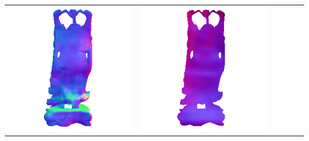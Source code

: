 \begin{tabularx}{\linewidth}{@{}Y@{}Y@{}Y@{}Y@{}Y@{}Y@{}}
\includegraphics[width=\linewidth]{semisynthetic/20160617_20_marrnet_out.png} &
\includegraphics[width=\linewidth]{semisynthetic/20160617_20_ef_out.png} \\

\end{tabularx}

